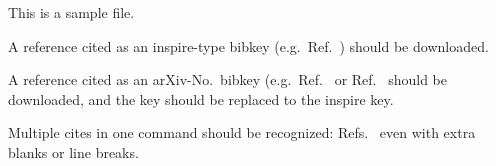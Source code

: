 \documentclass{article}
\begin{document}
This is a sample file.

A reference cited as an inspire-type bibkey (e.g.~Ref.~\cite{Maldacena:1997re}) should be downloaded.

A reference cited as an arXiv-No.~bibkey (e.g.~Ref.~\cite{astro-ph/0302209} or Ref.~\cite{0803.0547} should be downloaded, and the key should be replaced to the inspire key.

Multiple cites in one command should be recognized: Refs.~\cite{  hep-th/9908142  ,  hep-th/9905111       ,
Salpeter:1955it } even with extra blanks or line breaks.
\end{document}

